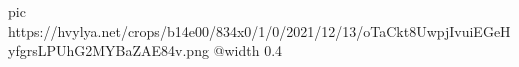  
 
 
 
 

\ifcmt
  pic https://hvylya.net/crops/b14e00/834x0/1/0/2021/12/13/oTaCkt8UwpjIvuiEGeHyfgrsLPUhG2MYBaZAE84v.png
  @width 0.4
\fi

\begin{center}
\end{center}
